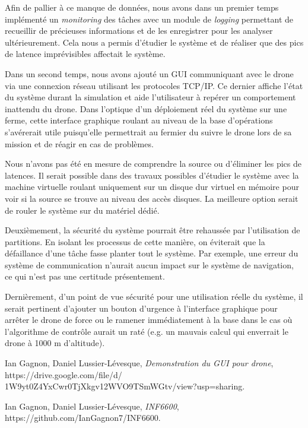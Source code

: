 \documentclass[journal]{IEEEtran}
\begin{document}
Afin de pallier à ce manque de données, nous avons dans un premier temps implémenté un \textit{monitoring} des tâches avec un module de \textit{logging} permettant de recueillir de précieuses informations et de les enregistrer pour les analyser ultérieurement. Cela nous a permis d'étudier le système et de réaliser que des pics de latence imprévisibles affectait le système.

Dans un second temps, nous avons ajouté un GUI communiquant avec le drone via une connexion réseau utilisant les protocoles TCP/IP. Ce dernier affiche l'état du système durant la simulation et aide l'utilisateur à repérer un comportement inattendu du drone. Dans l'optique d'un déploiement réel du système sur une ferme, cette interface graphique roulant au niveau de la base d'opérations s'avérerait utile puisqu'elle permettrait au fermier du suivre le drone lors de sa mission et de réagir en cas de problèmes.

Nous n'avons pas été en mesure de comprendre la source ou d'éliminer les pics de latences. Il serait possible dans des travaux possibles d'étudier le système avec la machine virtuelle roulant uniquement sur un disque dur virtuel en mémoire pour voir si la source se trouve au niveau des accès disques. La meilleure option serait de rouler le système sur du matériel dédié.

Deuxièmement, la sécurité du système pourrait être rehaussée par l'utilisation de partitions. En isolant les processus de cette manière, on éviterait que la défaillance d'une tâche fasse planter tout le système. Par exemple, une erreur du système de communication n'aurait aucun impact sur le système de navigation, ce qui n'est pas une certitude présentement.

Dernièrement, d'un point de vue sécurité pour une utilisation réelle du système, il serait pertinent d'ajouter un bouton d'urgence à l'interface graphique pour arrêter le drone de force ou le ramener immédiatement à la base dans le cas où l'algorithme de contrôle aurait un raté (e.g. un mauvais calcul qui enverrait le drone à 1000 m d'altitude). 


\begin{thebibliography}{1}

Ian Gagnon, Daniel Lussier-Lévesque, \emph{Demonstration du GUI pour drone},\newline
https://drive.google.com/file/d/\newline
1W9yt0Z4YxCwr0TjXkgv12WVO9TSmWGtv/view?usp=sharing.

Ian Gagnon, Daniel Lussier-Lévesque, \emph{INF6600},\newline
https://github.com/IanGagnon7/INF6600.


\end{thebibliography}







\end{document}
